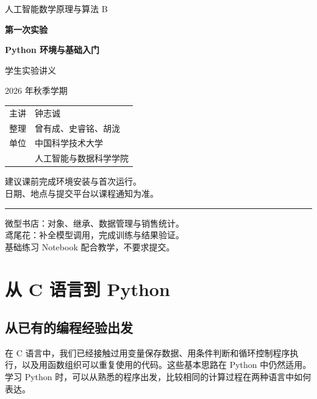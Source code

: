 \documentclass[UTF8,a4paper,11pt,fontset=fandol]{ctexart}
\begin{document}
\raggedright
\setlength{\parindent}{2em}
\hypersetup{pageanchor=false}
\begin{titlepage}
\thispagestyle{empty}
\vspace*{1.5cm}
{\Large\color{Navy}人工智能数学原理与算法 B\par}
\vspace{1cm}
{\huge\bfseries\color{Ink}第一次实验\par}
\vspace{.45cm}
{\LARGE\bfseries\color{Ink}Python 环境与基础入门\par}
\vspace{.6cm}
{\Large 学生实验讲义\par}
\vspace{1cm}
{\large 2026 年秋季学期\par}
\vspace{.8cm}
\begin{tabular}{@{}ll}
主讲 & 钟志诚\\[.35em]
整理 & 曾有成、史睿铭、胡泷\\[.35em]
单位 & 中国科学技术大学\\
     & 人工智能与数据科学学院
\end{tabular}
\vspace{1cm}\par
建议课前完成环境安装与首次运行。\\
日期、地点与提交平台以课程通知为准。\par
\vfill
\noindent\rule{\linewidth}{.5pt}\par
微型书店：对象、继承、数据管理与销售统计。\\
鸢尾花：补全模型调用，完成训练与结果验证。\\
基础练习 Notebook 配合教学，不要求提交。\par
\end{titlepage}
\hypersetup{pageanchor=true}
\tableofcontents
\clearpage
{}
\section{从 C 语言到 Python}\label{ux4ece-c-ux8bedux8a00ux5230-python}

\subsection{从已有的编程经验出发}\label{ux4eceux5df2ux6709ux7684ux7f16ux7a0bux7ecfux9a8cux51faux53d1}

在 C 语言中，我们已经接触过用变量保存数据、用条件判断和循环控制程序执行，以及用函数组织可以重复使用的代码。这些基本思路在 Python 中仍然适用。学习 Python 时，可以从熟悉的程序出发，比较相同的计算过程在两种语言中如何表达。
\end{document}
